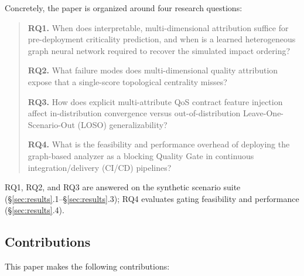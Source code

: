 \documentclass[review]{elsarticle}
\begin{document}
Concretely, the paper is organized around four research questions:

\begin{quote}
\textbf{RQ1.} When does interpretable, multi-dimensional attribution suffice for pre-deployment
criticality prediction, and when is a learned heterogeneous graph neural network required to
recover the simulated impact ordering?

\textbf{RQ2.} What failure modes does multi-dimensional quality attribution expose that a
single-score topological centrality misses?

\textbf{RQ3.} How does explicit multi-attribute QoS contract feature injection affect
in-distribution convergence versus out-of-distribution Leave-One-Scenario-Out (LOSO)
generalizability?

\textbf{RQ4.} What is the feasibility and performance overhead of deploying the graph-based analyzer
as a blocking Quality Gate in continuous integration/delivery (CI/CD) pipelines?
\end{quote}

RQ1, RQ2, and RQ3 are answered on the synthetic scenario suite (\S\ref{sec:results}.1--\S\ref{sec:results}.3); RQ4 evaluates gating
feasibility and performance (\S\ref{sec:results}.4).

\subsection{Contributions}

This paper makes the following contributions:
\end{document}
